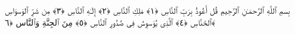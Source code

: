 
  
    
  
    
    

\nopagebreak
  بِسمِ ٱللَّهِ ٱلرَّحمَـٰنِ ٱلرَّحِيمِ
  قُل أَعُوذُ بِرَبِّ ٱلنَّاسِ ﴿١﴾
 مَلِكِ ٱلنَّاسِ ﴿٢﴾
 إِلَـٰهِ ٱلنَّاسِ ﴿٣﴾
 مِن شَرِّ ٱلوَسوَاسِ ٱلخَنَّاسِ ﴿٤﴾
 ٱلَّذِى يُوَسوِسُ فِى صُدُورِ ٱلنَّاسِ ﴿٥﴾
 مِنَ ٱلجِنَّةِ وَٱلنَّاس ﴿٦﴾
 
